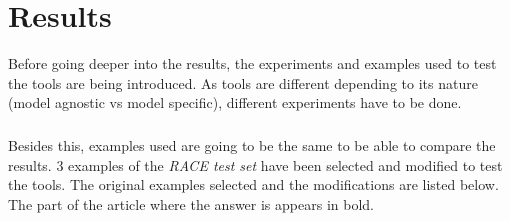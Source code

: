 
\chapter{Results}
\label{ch:Results}
\noindent Before going deeper into the results, the experiments and examples used to test the tools are being introduced. As tools are different depending to its nature (model agnostic vs model specific), different experiments have to be done.
\paragraph{}
\label{ex:intro}
Besides this, examples used are going to be the same to be able to compare the results. 3 examples of the \emph{RACE test set} have been selected and modified to test the tools. The original examples selected and the modifications are listed below. The part of the article where the answer is appears in bold.

